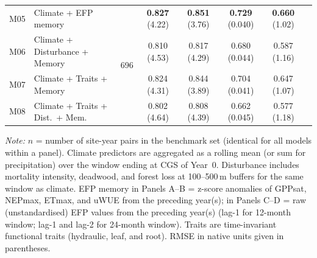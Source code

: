 \begin{table}[htbp]
\begin{tabular}{llcccccc}
M05 & Climate + EFP memory             & \multirow{4}{*}{696} & \textbf{0.827} (4.22) & \textbf{0.851} (3.76) & \textbf{0.729} (0.040) & \textbf{0.660} (1.02) \\
M06 & Climate + Disturbance + Memory   &                      & 0.810 (4.53) & 0.817 (4.29) & 0.680 (0.044) & 0.587 (1.16) \\
M07 & Climate + Traits + Memory        &                      & 0.824 (4.31) & 0.844 (3.89) & 0.704 (0.041) & 0.647 (1.07) \\
M08 & Climate + Traits + Dist.\ + Mem. &                      & 0.802 (4.64) & 0.808 (4.39) & 0.662 (0.045) & 0.577 (1.18) \\
\bottomrule
\end{tabular}
\vspace{2pt}
\begin{minipage}{\linewidth}
\footnotesize
\textit{Note:} $n$ = number of site-year pairs in the benchmark set (identical for
all models within a panel). Climate predictors are aggregated as a rolling mean
(or sum for precipitation) over the window ending at CGS of Year~0.
Disturbance includes mortality intensity, deadwood, and forest loss at 100--500\,m
buffers for the same window as climate. EFP memory in Panels A--B = z-score
anomalies of GPPsat, NEPmax, ETmax, and uWUE from the preceding year(s);
in Panels C--D = raw (unstandardised) EFP values from the preceding year(s)
(lag-1 for 12-month window; lag-1 and lag-2 for 24-month window).
Traits are time-invariant functional traits (hydraulic, leaf, and root).
RMSE in native units given in parentheses.
\end{minipage}
\end{table}

